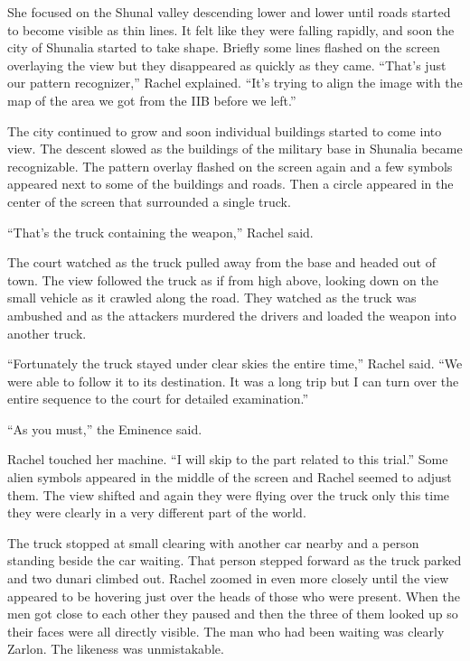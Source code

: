 She focused on the Shunal valley descending lower and lower until roads started to become
visible as thin lines. It felt like they were falling rapidly, and soon the city of Shunalia
started to take shape. Briefly some lines flashed on the screen overlaying the view but they
disappeared as quickly as they came. ``That's just our pattern recognizer,'' Rachel explained.
``It's trying to align the image with the map of the area we got from the IIB before we left.''

The city continued to grow and soon individual buildings started to come into view. The descent
slowed as the buildings of the military base in Shunalia became recognizable. The pattern
overlay flashed on the screen again and a few symbols appeared next to some of the buildings and
roads. Then a circle appeared in the center of the screen that surrounded a single truck.

``That's the truck containing the weapon,'' Rachel said.

The court watched as the truck pulled away from the base and headed out of town. The view
followed the truck as if from high above, looking down on the small vehicle as it crawled along
the road. They watched as the truck was ambushed and as the attackers murdered the drivers and
loaded the weapon into another truck.

``Fortunately the truck stayed under clear skies the entire time,'' Rachel said. ``We were able
to follow it to its destination. It was a long trip but I can turn over the entire sequence to
the court for detailed examination.''

``As you must,'' the Eminence said.

Rachel touched her machine. ``I will skip to the part related to this trial.'' Some alien
symbols appeared in the middle of the screen and Rachel seemed to adjust them. The view shifted
and again they were flying over the truck only this time they were clearly in a very different
part of the world.

The truck stopped at small clearing with another car nearby and a person standing beside the car
waiting. That person stepped forward as the truck parked and two dunari climbed out. Rachel
zoomed in even more closely until the view appeared to be hovering just over the heads of those
who were present. When the men got close to each other they paused and then the three of them
looked up so their faces were all directly visible. The man who had been waiting was clearly
Zarlon. The likeness was unmistakable.


